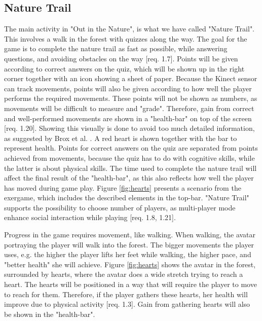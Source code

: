 \subsection{Nature Trail}
The main activity in "Out in the Nature", is what we have called "Nature Trail". This involves a walk in the forest with quizzes along the way. The goal for the game is to complete the nature trail as fast as possible, while answering questions, and avoiding obstacles on the way [req. 1.7]. Points will be given according to correct answers on the quiz, which will be shown up in the right corner together with an icon showing a sheet of paper. Because the Kinect sensor can track movements, points will also be given according to how well the player performs the required movements. These points will not be shown as numbers, as movements will be difficult to measure and "grade". Therefore, gain from correct and well-performed movements are shown in a "health-bar" on top of the screen [req. 1.20]. Showing this visually is done to avoid too much detailed information, as suggested by Brox et al. \cite{exergamesforelderly}. A red heart is shown together with the bar to represent health. Points for correct answers on the quiz are separated from points achieved from movements, because the quiz has to do with cognitive skills, while the latter is about physical skills. The time used to complete the nature trail will affect the final result of the "health-bar", as this also reflects how well the player has moved during game play. Figure \ref{fig:hearts} presents a scenario from the exergame, which includes the described elements in the top-bar. "Nature Trail" supports the possibility to choose number of players, as multi-player mode enhance social interaction while playing [req. 1.8, 1.21].  

Progress in the game requires movement, like walking. When walking, the avatar portraying the player will walk into the forest. The bigger movements the player uses, e.g. the higher the player lifts her feet while walking, the higher pace, and "better health" she will achieve. Figure \ref{fig:hearts} shows the avatar in the forest, surrounded by hearts, where the avatar does a wide stretch trying to reach a heart. The hearts will be positioned in a way that will require the player to move to reach for them. Therefore, if the player gathers these hearts, her health will improve due to physical activity [req. 1.3]. Gain from gathering hearts will also be shown in the "health-bar".   

